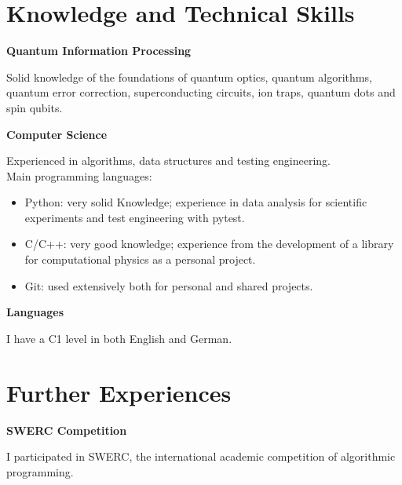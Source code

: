 \documentclass[a4paper,10pt]{article}
\begin{document}
\begin{adjustbox}{valign=t}
\begin{minipage}{0.6\textwidth}
\section*{Knowledge and Technical Skills}
\begin{description}
\setlength\itemsep{-2em}

\item \textbf{Quantum Information Processing}
\begin{spacing}{1.1}
	\small Solid knowledge of the foundations of quantum optics, quantum algorithms, quantum error correction, superconducting circuits, ion traps, quantum dots and spin qubits.
\end{spacing}
\item \textbf{Computer Science}
\begin{spacing}{1.1}
	\small
	Experienced in algorithms, data structures and testing engineering.\\
	Main programming languages: 
	\begin{itemize}
		\item Python: very solid Knowledge; experience in data analysis for scientific experiments and test engineering with pytest.
		\item C/C++: very good knowledge; experience from the development of a library for computational physics as a personal project.
		\item Git: used extensively both for personal and shared projects.
	\end{itemize}
\end{spacing}
\item \textbf{Languages}
\begin{spacing}{1.1}
	\small
I have a C1 level in both English and German.
\end{spacing}
\end{description}
\vspace{-1cm}
\section*{Further Experiences}
\begin{description}
\raggedright
\item[\normalfont \textcolor{ColorTwo}{March 2021}] 
	\textbf{SWERC Competition}\\
	\begin{spacing}{1.1}
		\small
		I participated in SWERC, the international academic competition of algorithmic programming.
	\end{spacing}
	
\end{description}

\end{minipage}
\end{adjustbox}
\end{document}

